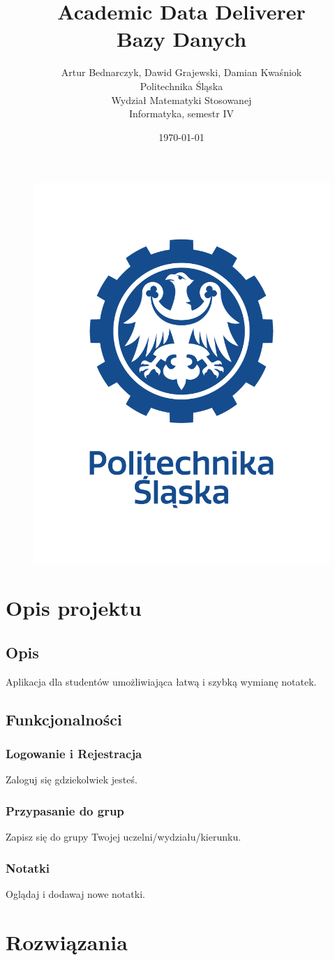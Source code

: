 \documentclass[12pt,a4paper]{article}
\title{Academic Data Deliverer\\Bazy Danych}
\author{Artur Bednarczyk, Dawid Grajewski, Damian Kwaśniok\\Politechnika Śląska\\Wydział Matematyki Stosowanej\\Informatyka, semestr IV}
\date{\today}
\begin{document}
	\maketitle
	\begin{figure}[H]
		\centering
		\includegraphics[width=0.5\linewidth]{LOGO2}
		\label{fig:logo}
	\end{figure}
	\clearpage
	\tableofcontents
	\clearpage
	\section{Opis projektu}
		\subsection{Opis}
			Aplikacja dla studentów umożliwiająca łatwą i szybką wymianę notatek.
		\subsection{Funkcjonalności}
			\subsubsection{Logowanie i Rejestracja}
				Zaloguj się gdziekolwiek jesteś.
			\subsubsection{Przypasanie do grup}
				Zapisz się do grupy Twojej uczelni/wydziału/kierunku.
			\subsubsection{Notatki}
				Oglądaj i dodawaj nowe notatki.
	\section{Rozwiązania}
\end{document}
